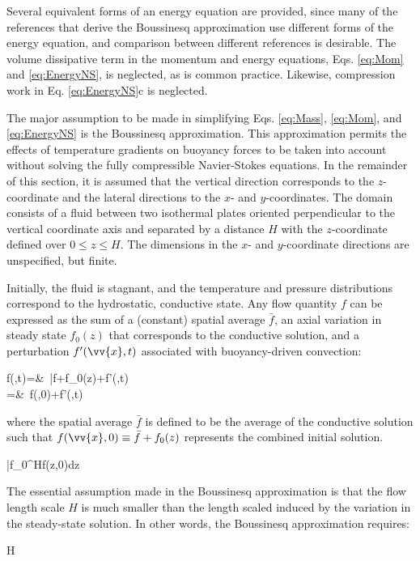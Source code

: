 \documentclass[10pt]{article}
\numberwithin{equation}{section} %
\begin{document}
Several equivalent forms of an energy equation are provided, since many of the references that derive the Boussinesq approximation use different forms of the energy equation, and comparison between different references is desirable. The volume dissipative term in the momentum and energy equations, Eqs. \eqref{eq:Mom} and \eqref{eq:EnergyNS}, is neglected, as is common practice. Likewise, compression work in Eq. \eqref{eq:EnergyNS}c is neglected.  

The major assumption to be made in simplifying Eqs. \eqref{eq:Mass}, \eqref{eq:Mom}, and \eqref{eq:EnergyNS} is the Boussinesq approximation. This approximation permits the effects of temperature gradients on buoyancy forces to be taken into account without solving the fully compressible Navier-Stokes equations. In the remainder of this section, it is assumed that the vertical direction corresponds to the \(z\)-coordinate and the lateral directions to the \(x\)- and \(y\)-coordinates. The domain consists of a fluid between two isothermal plates oriented perpendicular to the vertical coordinate axis and separated by a distance \(H\) with the \(z\)-coordinate defined over \(0\leq z\leq H\). The dimensions in the \(x\)- and \(y\)-coordinate directions are unspecified, but finite.

Initially, the fluid is stagnant, and the temperature and pressure distributions correspond to the hydrostatic, conductive state. Any flow quantity \(f\) can be expressed as the sum of a (constant) spatial average \(\bar{f}\), an axial variation in steady state \(f_0(z)\) that corresponds to the conductive solution, and a perturbation \(f'(\vv{x},t)\) associated with buoyancy-driven convection:

\beqa
\label{eq:Expansion}
f(,t)=&\ \bar{f}+f_0(z)+f'(,t)\\
=&\ f(,0)+f'(,t)
\eeqa

where the spatial average \(\bar{f}\) is defined to be the average of the conductive solution such that \(f(\vv{x},0)\equiv\bar{f}+f_0(z)\) represents the combined initial solution.

\beq
\bar{f}\equiv\int_{0}^{H}f(z,0)dz
\eeq

The essential assumption made in the Boussinesq approximation is that the flow length scale \(H\) is much smaller than the length scaled induced by the variation in the steady-state solution. In other words, the Boussinesq approximation requires:

\beq
\label{eq:BAssumption}
H 
\eeq
\end{document}
